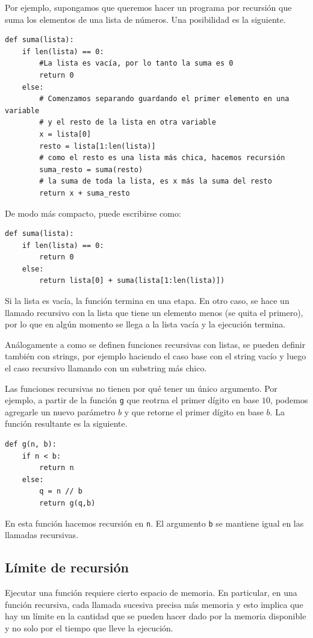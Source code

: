 \documentclass[a4paper, 12pt]{report}
\theoremstyle{definition}
\begin{document}
Por ejemplo, supongamos que queremos hacer un programa por recursión que suma los elementos de una lista de números. Una posibilidad es la siguiente.
\begin{verbatim}
def suma(lista):
    if len(lista) == 0:
        #La lista es vacía, por lo tanto la suma es 0
        return 0
    else:
        # Comenzamos separando guardando el primer elemento en una variable
        # y el resto de la lista en otra variable
        x = lista[0]
        resto = lista[1:len(lista)]
        # como el resto es una lista más chica, hacemos recursión
        suma_resto = suma(resto)
        # la suma de toda la lista, es x más la suma del resto
        return x + suma_resto
\end{verbatim}
De modo más compacto, puede escribirse como:
\begin{verbatim}
def suma(lista):
    if len(lista) == 0:
        return 0
    else:
        return lista[0] + suma(lista[1:len(lista)])
\end{verbatim}
Si la lista es vacía, la función termina en una etapa. En otro caso, se hace un llamado recursivo con la lista que tiene un elemento menos (se quita el primero), por lo que en algún momento se llega a la lista vacía y la ejecución termina.

Análogamente a como se definen funciones recursivas con listas, se pueden definir también con strings, por ejemplo haciendo el caso base con el string vacío y luego el caso recursivo llamando con un substring más chico.

Las funciones recursivas no tienen por qué tener un único argumento. Por ejemplo, a partir de la función {\tt g} que reotrna el primer dígito en base $10$, podemos agregarle un nuevo parámetro $b$ y que retorne el primer dígito en base $b$. La función resultante es la siguiente.
\begin{verbatim}
def g(n, b):
    if n < b:
        return n
    else:
        q = n // b
        return g(q,b)
\end{verbatim}
En esta función hacemos recursión en {\tt n}. El argumento {\tt b} se mantiene igual en las llamadas recursivas.

\subsection{Límite de recursión}

Ejecutar una función requiere cierto espacio de memoria. En particular, en una función recursiva, cada llamada sucesiva precisa más memoria y esto implica que hay un límite en la cantidad que se pueden hacer dado por la memoria disponible y no solo por el tiempo que lleve la ejecución.
\end{document}
